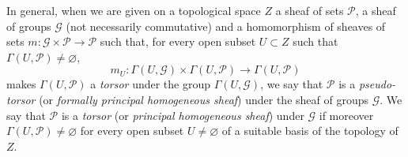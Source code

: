 \begin{env}[16.5.15]\label{IV.16.5.15}
In general, when we are given on a topological space $Z$ a sheaf of
sets $\mathscr{P}$, a sheaf of groups $\mathscr{G}$ (not necessarily
commutative) and a homomorphism of sheaves of sets
$m:\mathscr{G}\times\mathscr{P}\to\mathscr{P}$ such that, for every open subset
$U\subset Z$ such that $\Gamma(U,\mathscr{P})\neq\varnothing$,
\[
  m_U:\Gamma(U,\mathscr{G})\times\Gamma(U,\mathscr{P})
  \longrightarrow\Gamma(U,\mathscr{P})
\]
makes $\Gamma(U,\mathscr{P})$ a \emph{torsor} under the group
$\Gamma(U,\mathscr{G})$, we say that $\mathscr{P}$ is a
\emph{pseudo-torsor} (or \emph{formally principal homogeneous sheaf})
under the sheaf of groups $\mathscr{G}$. We say that $\mathscr{P}$ is a
\emph{torsor} (or \emph{principal homogeneous sheaf}) under $\mathscr{G}$ if
moreover $\Gamma(U,\mathscr{P})\neq\varnothing$ for every open subset
$U\neq\varnothing$ of a suitable basis of the topology of $Z$.


\end{env}
